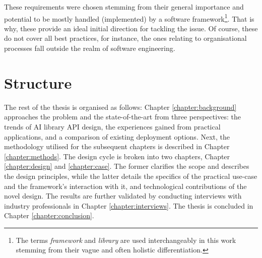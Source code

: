 These requirements were chosen stemming from their general importance and potential to be mostly handled (implemented) by a software framework\footnote{The terms \textit{framework} and \textit{library} are used interchangeably in this work stemming from their vague and often holistic differentiation.}. That is why, these provide an ideal initial direction for tackling the issue. Of course, these do not cover all best practices, for instance, the ones relating to organisational processes fall outside the realm of software engineering.

\newpage

\section{Structure}

The rest of the thesis is organised as follows: Chapter \ref{chapter:background} approaches the problem and the state-of-the-art from three perspectives: the trends of AI library API design, the experiences gained from practical applications, and a comparison of existing deployment options. Next, the methodology utilised for the subsequent chapters is described in Chapter \ref{chapter:methods}. The design cycle is broken into two chapters, Chapter  \ref{chapter:design} and \ref{chapter:case}. The former clarifies the scope and describes the design principles, while the latter details the specifics of the practical use-case and the framework's interaction with it, and technological contributions of the novel design. The results are further validated by conducting interviews with industry professionals in Chapter \ref{chapter:interviews}. The thesis is concluded in Chapter \ref{chapter:conclusion}.
